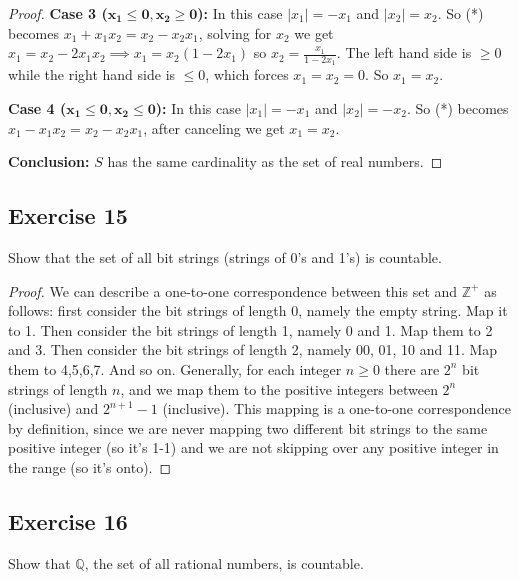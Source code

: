 \documentclass[14pt]{extarticle}
\newcommand{\dps}{\displaystyle}
\newcommand{\Q}{\mathbb{Q}}
\newcommand{\Z}{\mathbb{Z}}
\begin{document}
\begin{proof}
        {\bf Case 3 (\(\bm{x_1 \leq 0, x_2 \geq 0}\)):} In this case \(|x_1| = -x_1\) and \(|x_2| = x_2\). So (*) becomes
    \(x_1 + x_1x_2 = x_2 - x_2x_1\), solving for $x_2$ we get \(x_1 = x_2 - 2x_1x_2 \implies x_1 = x_2(1-2x_1)\) so
    \(\dps x_2 = \frac{x_1}{1-2x_1}\). The left hand side is \(\geq 0\) while the right hand side is \(\leq 0\), which
    forces \(x_1 = x_2 = 0\). So \(x_1 = x_2\).

        {\bf Case 4 (\(\bm{x_1 \leq 0, x_2 \leq 0}\)):} In this case \(|x_1| = -x_1\) and \(|x_2| = -x_2\). So (*) becomes
    \(x_1 - x_1x_2 = x_2 - x_2x_1\), after canceling we get \(x_1 = x_2\).

        {\bf Conclusion:} $S$ has the same cardinality as the set of real numbers.
\end{proof}

\subsection{Exercise 15}
Show that the set of all bit strings (strings of 0’s and 1’s) is countable.

\begin{proof}
    We can describe a one-to-one correspondence between this set and $\Z^+$ as follows: first consider the bit strings
    of length 0, namely the empty string. Map it to 1. Then consider the bit strings of length 1, namely 0 and 1. Map
    them to 2 and 3. Then consider the bit strings of length 2, namely 00, 01, 10 and 11. Map them to 4,5,6,7. And so on.
    Generally, for each integer \(n \geq 0\) there are \(2^n\) bit strings of length $n$, and we map them to the positive
    integers between \(2^n\) (inclusive) and \(2^{n+1}-1\) (inclusive). This mapping is a one-to-one correspondence by
    definition, since we are never mapping two different bit strings to the same positive integer (so it's 1-1) and we
    are not skipping over any positive integer in the range (so it's onto).
\end{proof}

\subsection{Exercise 16}
Show that $\Q$, the set of all rational numbers, is countable.
\end{document}
